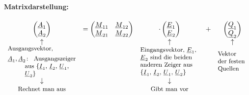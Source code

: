 \paragraph{Matrixdarstellung:}
\[\begin{array}{clccc}
    \begin{pmatrix}\cn{A}_1\\\cn{A}_2\end{pmatrix}
    &= \begin{pmatrix}
        \cn{M}_{11} & \cn{M}_{12} \\
        \cn{M}_{21} & \cn{M}_{22}
      \end{pmatrix}
    &\cdot\begin{pmatrix}
          \cn{E}_1  \\  \cn{E}_2
         \end{pmatrix}
    &+&\begin{pmatrix}
        \cn{Q}_1  \\ \cn{Q}_2
      \end{pmatrix} \\
  \uparrow  && \uparrow &&\uparrow\\
  \begin{minipage}{3.5cm}\small\raggedright
    \text{Ausgangsvektor,}
    \begin{description}
      \item[$\cn{A}_1, \cn{A}_2\colon$]
      Ausgangs\-zeiger aus
      \{$\cn{I}_1$, $\cn{I}_2$, $\cn{U}_1$, $\cn{U}_2$\}
    \end{description}
  \end{minipage}
  &&\begin{minipage}{3cm}\small\raggedright
      Eingangsvektor,
      $\cn{E}_1$, $\cn{E}_2$ sind die beiden
      anderen Zeiger aus
      \{$\cn{I}_1$, $\cn{I}_2$, $\cn{U}_1$, $\cn{U}_2$\}
   \end{minipage}
   &&\begin{minipage}{1.5cm}\small\raggedright
      Vektor der festen Quellen
    \end{minipage}  \\
  \downarrow  &&  \downarrow \\
  \text{\small Rechnet man aus}
  &&\text{\small Gibt man vor}
  \end{array}\]

